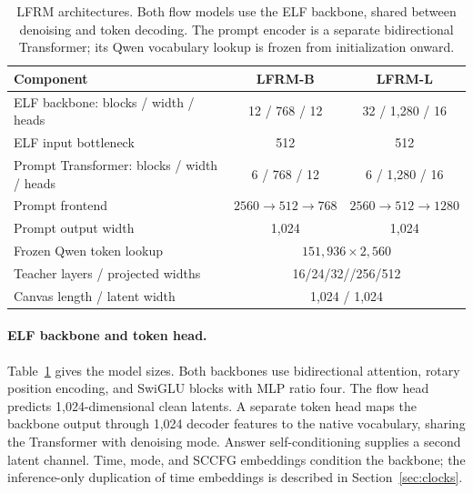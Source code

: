 \documentclass{article}
\begin{document}
\begin{table}[!htb]
\centering\small
\setlength{\tabcolsep}{7pt}
\caption{LFRM architectures. Both flow models use the ELF backbone, shared between denoising and token decoding. The prompt encoder is a separate bidirectional Transformer; its Qwen vocabulary lookup is frozen from initialization onward.}
\label{tab:architectures}
\begin{tabular}{@{}lcc@{}}
\toprule
Component & LFRM-B & LFRM-L\\
\midrule
ELF backbone: blocks / width / heads & 12 / 768 / 12 & 32 / 1,280 / 16\\
ELF input bottleneck & 512 & 512\\
Prompt Transformer: blocks / width / heads & 6 / 768 / 12 & 6 / 1,280 / 16\\
Prompt frontend & $2560\to512\to768$ & $2560\to512\to1280$\\
Prompt output width & 1,024 & 1,024\\
Frozen Qwen token lookup & \multicolumn{2}{c}{$151{,}936\times2{,}560$}\\
Teacher layers / projected widths & \multicolumn{2}{c}{16/24/32\quad /\quad 256/256/512}\\
Canvas length / latent width & \multicolumn{2}{c}{1,024 / 1,024}\\
\bottomrule
\end{tabular}
\end{table}

\paragraph{ELF backbone and token head.}
Table~\ref{tab:architectures} gives the model sizes. Both backbones use bidirectional attention, rotary position encoding, and SwiGLU blocks with MLP ratio four. The flow head predicts 1,024-dimensional clean latents. A separate token head maps the backbone output through 1,024 decoder features to the native vocabulary, sharing the Transformer with denoising mode. Answer self-conditioning supplies a second latent channel. Time, mode, and SCCFG embeddings condition the backbone; the inference-only duplication of time embeddings is described in Section~\ref{sec:clocks}.
\end{document}
